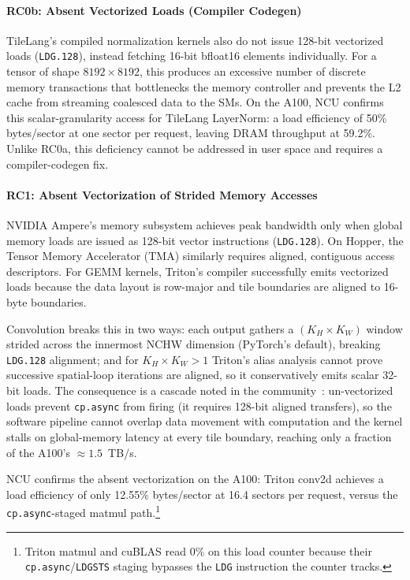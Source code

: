 \paragraph{RC0b: Absent Vectorized Loads (Compiler Codegen)}
TileLang's compiled normalization kernels also do not issue 128-bit vectorized loads
(\texttt{LDG.128}),
instead fetching 16-bit bfloat16 elements individually.
For a tensor of shape $8192 \times 8192$,
this produces an excessive number of discrete memory transactions
that bottlenecks the memory controller
and prevents the L2 cache from streaming coalesced data to the SMs.
On the A100, NCU confirms this scalar-granularity access for TileLang LayerNorm: a load efficiency of 50\% bytes/sector at one sector per request, leaving DRAM throughput at 59.2\%.
Unlike RC0a, this deficiency cannot be addressed in user space and requires a compiler-codegen fix.

\label{sec:analysis:vec}
\paragraph{RC1: Absent Vectorization of Strided Memory Accesses}
NVIDIA Ampere's memory subsystem achieves peak bandwidth only when global memory loads
are issued as 128-bit vector instructions (\texttt{LDG.128}).
On Hopper, the Tensor Memory Accelerator (TMA) similarly requires
aligned, contiguous access descriptors.
For GEMM kernels, Triton's compiler successfully emits vectorized loads
because the data layout is row-major and tile boundaries are aligned to 16-byte boundaries.

Convolution breaks this in two ways: each output gathers a $(K_H\times K_W)$ window strided across the innermost NCHW dimension (PyTorch's default), breaking \texttt{LDG.128} alignment; and for $K_H\times K_W>1$ Triton's alias analysis cannot prove successive spatial-loop iterations are aligned, so it conservatively emits scalar 32-bit loads.
The consequence is a cascade noted in the community~\cite{triton2022conv591}: un-vectorized loads prevent \texttt{cp.async} from firing (it requires 128-bit aligned transfers), so the software pipeline cannot overlap data movement with computation and the kernel stalls on global-memory latency at every tile boundary, reaching only a fraction of the A100's ${\approx}1.5$~TB/s.

NCU confirms the absent vectorization on the A100: Triton conv2d achieves a load efficiency of only 12.55\% bytes/sector at 16.4 sectors per request, versus the \texttt{cp.async}-staged matmul path.\footnote{Triton matmul and cuBLAS read 0\% on this load counter because their \texttt{cp.async}/\texttt{LDGSTS} staging bypasses the \texttt{LDG} instruction the counter tracks.}

